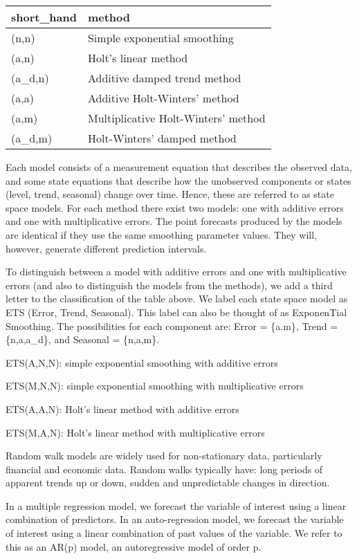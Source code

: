 \documentclass[]{book}
\begin{document}
\begin{longtable}[]{@{}ll@{}}
\toprule
short\_hand & method\tabularnewline
\midrule
\endhead
(n,n) & Simple exponential smoothing\tabularnewline
(a,n) & Holt's linear method\tabularnewline
(a\_d,n) & Additive damped trend method\tabularnewline
(a,a) & Additive Holt-Winters' method\tabularnewline
(a,m) & Multiplicative Holt-Winters' method\tabularnewline
(a\_d,m) & Holt-Winters' damped method\tabularnewline
\bottomrule
\end{longtable}

Each model consists of a measurement equation that describes the
observed data, and some state equations that describe how the unobserved
components or states (level, trend, seasonal) change over time. Hence,
these are referred to as state space models. For each method there exist
two models: one with additive errors and one with multiplicative errors.
The point forecasts produced by the models are identical if they use the
same smoothing parameter values. They will, however, generate different
prediction intervals.

To distinguish between a model with additive errors and one with
multiplicative errors (and also to distinguish the models from the
methods), we add a third letter to the classification of the table
above. We label each state space model as ETS (Error, Trend, Seasonal).
This label can also be thought of as ExponenTial Smoothing. The
possibilities for each component are: Error = \{a.m\}, Trend =
\{n,a,a\_d\}, and Seasonal = \{n,a,m\}.

ETS(A,N,N): simple exponential smoothing with additive errors

ETS(M,N,N): simple exponential smoothing with multiplicative errors

ETS(A,A,N): Holt's linear method with additive errors

ETS(M,A,N): Holt's linear method with multiplicative errors

Random walk models are widely used for non-stationary data, particularly
financial and economic data. Random walks typically have: long periods
of apparent trends up or down, sudden and unpredictable changes in
direction.

In a multiple regression model, we forecast the variable of interest
using a linear combination of predictors. In an auto-regression model,
we forecast the variable of interest using a linear combination of past
values of the variable. We refer to this as an AR(p) model, an
autoregressive model of order p.
\end{document}
